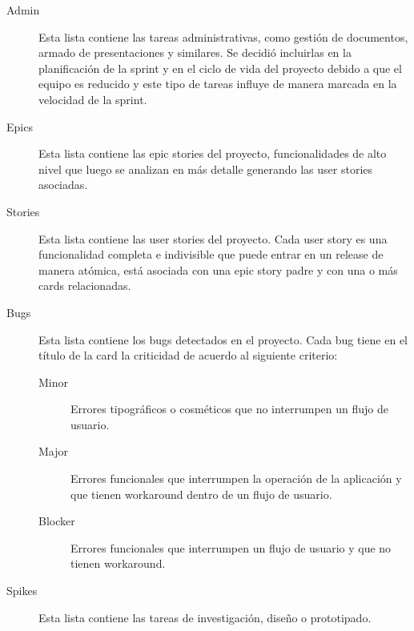 \documentclass[a4paper,11pt]{article}
\begin{document}
\begin{description}

  \item[Admin]

    Esta lista contiene las tareas administrativas, como gestión de documentos,
    armado de presentaciones y similares. Se decidió incluirlas en la
    planificación de la sprint y en el ciclo de vida del proyecto debido a que
    el equipo es reducido y este tipo de tareas influye de manera marcada en la
    velocidad de la sprint.

  \item[Epics]

    Esta lista contiene las epic stories del proyecto, funcionalidades de alto
    nivel que luego se analizan en más detalle generando las user stories
    asociadas.

  \item[Stories]

    Esta lista contiene las user stories del proyecto. Cada user story es una
    funcionalidad completa e indivisible que puede entrar en un release de
    manera atómica, está asociada con una epic story padre y con una o más
    cards relacionadas.

  \item[Bugs]

    Esta lista contiene los bugs detectados en el proyecto. Cada bug tiene en
    el título de la card la criticidad de acuerdo al siguiente criterio:

    \begin{description}

      \item[Minor]

        Errores tipográficos o cosméticos que no interrumpen un flujo de
        usuario.

      \item[Major]

        Errores funcionales que interrumpen la operación de la aplicación y que
        tienen workaround dentro de un flujo de usuario.

      \item[Blocker]

        Errores funcionales que interrumpen un flujo de usuario y que no tienen
        workaround.

    \end{description}

  \item[Spikes]

    Esta lista contiene las tareas de investigación, diseño o prototipado.

\end{description}
\end{document}

